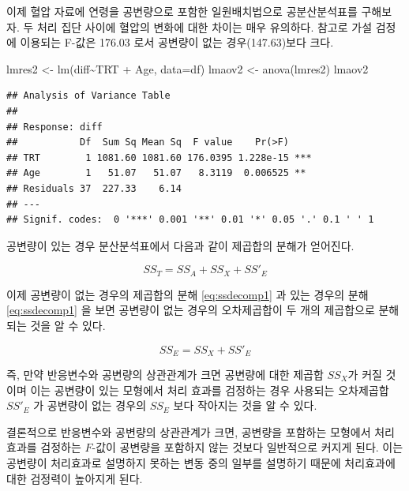 \documentclass[
]{book}
\newenvironment{Shaded}{\begin{snugshade}}{\end{snugshade}}
\newcommand{\AttributeTok}[1]{\textcolor[rgb]{0.77,0.63,0.00}{#1}}
\newcommand{\FunctionTok}[1]{\textcolor[rgb]{0.00,0.00,0.00}{#1}}
\newcommand{\NormalTok}[1]{#1}
\newcommand{\OtherTok}[1]{\textcolor[rgb]{0.56,0.35,0.01}{#1}}
\newcommand{\SpecialCharTok}[1]{\textcolor[rgb]{0.00,0.00,0.00}{#1}}
\begin{document}
이제 혈압 자료에 연령을 공변량으로 포함한 일원배치법으로 공분산분석표를 구해보자. 두 처리 집단 사이에 혈압의 변화에 대한 차이는 매우 유의하다. 참고로 가설 검정에 이용되는 F-값은 176.03 로서 공변량이 없는 경우(147.63)보다 크다.

\begin{Shaded}
\begin{Highlighting}[]
\NormalTok{lmres2 }\OtherTok{\textless{}{-}} \FunctionTok{lm}\NormalTok{(diff}\SpecialCharTok{\textasciitilde{}}\NormalTok{TRT }\SpecialCharTok{+}\NormalTok{ Age, }\AttributeTok{data=}\NormalTok{df)}
\NormalTok{lmaov2 }\OtherTok{\textless{}{-}} \FunctionTok{anova}\NormalTok{(lmres2)}
\NormalTok{lmaov2}
\end{Highlighting}
\end{Shaded}

\begin{verbatim}
## Analysis of Variance Table
## 
## Response: diff
##           Df  Sum Sq Mean Sq  F value    Pr(>F)    
## TRT        1 1081.60 1081.60 176.0395 1.228e-15 ***
## Age        1   51.07   51.07   8.3119  0.006525 ** 
## Residuals 37  227.33    6.14                       
## ---
## Signif. codes:  0 '***' 0.001 '**' 0.01 '*' 0.05 '.' 0.1 ' ' 1
\end{verbatim}

공변량이 있는 경우 분산분석표에서 다음과 같이 제곱합의 분해가 얻어진다.

\begin{equation}
SS_T = SS_A + SS_X + SS'_E
\label{eq:ssdecomp2}
\end{equation}

이제 공변량이 없는 경우의 제곱합의 분해 \eqref{eq:ssdecomp1} 과 있는 경우의 분해 \eqref{eq:ssdecomp1} 을 보면 공변량이 없는 경우의 오차제곱합이 두 개의 제곱합으로 분해되는 것을 알 수 있다.

\begin{equation}
SS_E = SS_X + SS'_E
\label{eq:anocvadecomp}
\end{equation}

즉, 만약 반응변수와 공변량의 상관관계가 크면 공변량에 대한 제곱합 \(SS_X\)가 커질 것이며 이는
공변량이 있는 모형에서 처리 효과를 검정하는 경우 사용되는 오차제곱합 \(SS'_E\) 가 공변량이 없는
경우의 \(SS_E\) 보다 작아지는 것을 알 수 있다.

결론적으로 반응변수와 공변량의 상관관계가 크면, 공변량을 포함하는 모형에서 처리 효과를 검정하는 \(F\)-값이 공변량을 포함하지 않는 것보다 일반적으로 커지게 된다. 이는 공변량이 처리효과로 설명하지 못하는 변동 중의 일부를 설명하기 때문에 처리효과에 대한 검정력이 높아지게 된다.
\end{document}
